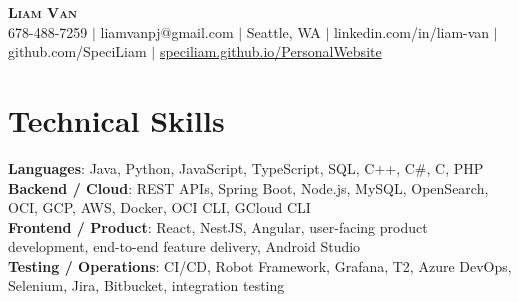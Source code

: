 \documentclass[letterpaper,11pt]{article}
\begin{document}

%
\begin{center}
    \textbf{\Huge \scshape Liam Van} \\ \vspace{1pt}
    \small 678-488-7259 $|$ \small {liamvanpj@gmail.com} $|$ Seattle, WA
 {{$|$ linkedin.com/in/liam-van} {$|$ github.com/SpeciLiam} {$|$ \href{https://speciliam.github.io/PersonalWebsite}{speciliam.github.io/PersonalWebsite}}}

\end{center}

\section{Technical Skills}
 \begin{itemize}[leftmargin=0.15in, label={}]
    \small{\item{
     \textbf{Languages}{: Java, Python, JavaScript, TypeScript, SQL, C++, C\#, C, PHP} \\
     \textbf{Backend / Cloud}{: REST APIs, Spring Boot, Node.js, MySQL, OpenSearch, OCI, GCP, AWS, Docker, OCI CLI, GCloud CLI} \\
     \textbf{Frontend / Product}{: React, NestJS, Angular, user-facing product development, end-to-end feature delivery, Android Studio} \\
     \textbf{Testing / Operations}{: CI/CD, Robot Framework, Grafana, T2, Azure DevOps, Selenium, Jira, Bitbucket, integration testing} \\
    }}
 \end{itemize}
%
\end{document}
